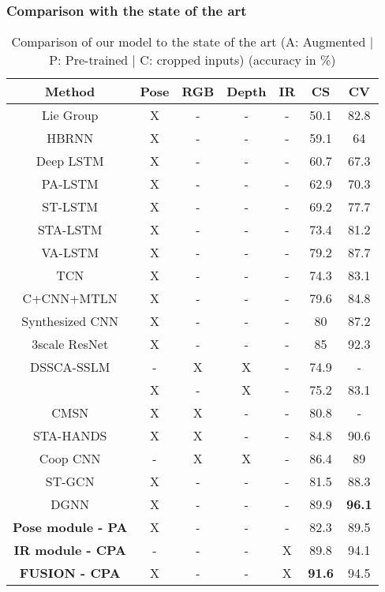 \documentclass[letterpaper, 10 pt, conference]{ieeeconf}
\begin{document}
\subsubsection{Comparison with the state of the art}
\begin{table}[t]
\caption{Comparison of our model to the state of the art (A: Augmented | P: Pre-trained | C: cropped inputs) (accuracy in \%)}
\label{state_of_the_art}
\begin{center}
\begin{tabular}{ccccccc}
Method & Pose & RGB & Depth & IR & CS & CV \\
\hline \hline
Lie Group \cite{vemulapalli2014human} & X & - & - & - & 50.1 & 82.8 \\
\hline
HBRNN \cite{du2015hierarchical} & X & - & - & - & 59.1 & 64 \\
Deep LSTM \cite{shahroudy2016ntu} & X & - & - & - & 60.7 & 67.3 \\
PA-LSTM \cite{shahroudy2016ntu} & X & - & - & - & 62.9 & 70.3 \\
ST-LSTM \cite{liu2016spatio} & X & - & - & - & 69.2 & 77.7 \\
STA-LSTM \cite{song2017end} & X & - & - & - & 73.4 & 81.2 \\
VA-LSTM \cite{zhang2017view} & X & - & - & - & 79.2 & 87.7 \\
\hline
TCN \cite{kim2017interpretable} & X & - & - & - & 74.3 & 83.1 \\
C+CNN+MTLN \cite{ke2017new} & X & - & - & - & 79.6 & 84.8 \\
Synthesized CNN \cite{liu2017enhanced} & X & - & - & - & 80 & 87.2 \\
3scale ResNet \cite{li2017skeleton} & X & - & - & - & 85 & 92.3 \\
\hline
DSSCA-SSLM \cite{shahroudy2017deep} & - & X & X & - & 74.9 & - \\
\cite{rahmani2017learning} & X & - & X & - & 75.2 & 83.1 \\
CMSN \cite{zolfaghari2017chained} & X & X & - & - & 80.8 & - \\
STA-HANDS \cite{baradel2017pose} & X & X & - & - & 84.8 & 90.6 \\
Coop CNN \cite{wang2018cooperative} & - & X & X & - & 86.4 & 89 \\
\hline
ST-GCN \cite{yan2018spatial} & X & - & - & - & 81.5 & 88.3 \\
DGNN \cite{shi2019skeleton} & X & - & - & - & 89.9 & \textbf{96.1} \\
\hline
\textbf{Pose module - PA} & X & - & - & - & 82.3 & 89.5 \\
\textbf{IR module - CPA} & - & - & - & X & 89.8 & 94.1 \\
\textbf{FUSION - CPA} & X & - & - & X & \textbf{91.6} & 94.5 \\ 
\end{tabular} 
\end{center}
\end{table}
\end{document}
